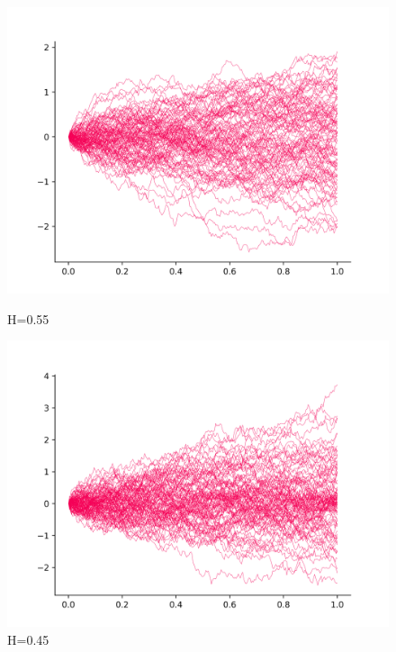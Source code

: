 \documentclass[a4paper,12pt]{article}
\numberwithin{equation}{section}
\begin{document}
	\begin{figure}[H]
		\includegraphics[scale=0.4]{image-1-55.png}
		\caption{H=0.55}
		\endminipage\hfill
		\includegraphics[scale=0.4]{image-1-45.png}
		\caption{H=0.45}
		\endminipage\hfill
	\end{figure}
	
\end{document}
